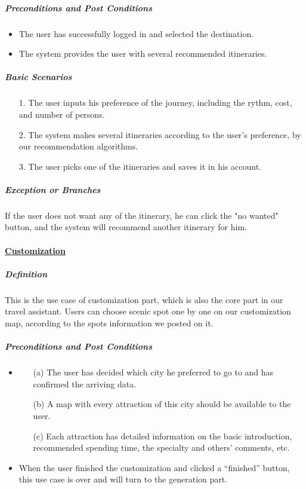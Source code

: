 \documentclass[10pt]{article}
\begin{document}
\begin{itemize}
		\subparagraph{Preconditions and Post Conditions}
		\begin{itemize}
			\item The user has successfully logged in and selected the destination.
			\item The system provides the user with several recommended itineraries.
		\end{itemize}

		\subparagraph{Basic Scenarios}
		\begin{itemize}
			\item[1.] The user inputs his preference of the journey, including the rythm, cost, and number of persons.
			\item[2.]The system makes several itineraries according to the user's preference, by our recommendation algorithms.
			\item[3.]The user picks one of the itineraries and saves it in his account.
		
		\end{itemize}

		\subparagraph{Exception or Branches}
		If the user does not want any of the itinerary, he can click the "no wanted" button, and the system will recommend another itinerary for him.

		\paragraph{\underline{Customization}}
		\subparagraph{Definition}
		This is the use case of customization part, which is also the core part in our travel assistant. Users can choose scenic spot one by one on our customization map, according to the spots information we posted on it.

		\subparagraph{Preconditions and Post Conditions}
		\begin{itemize}
			\item \begin{itemize}
				\item[(a)] The user has decided which city he preferred to go to and has confirmed the arriving data.
				\item[(b)] A map with every attraction of this city should be available to the user.
				\item[(c)] Each attraction has detailed information on the basic introduction, recommended spending time, the specialty and others’ comments, etc. 
			\end{itemize}
			\item When the user finished the customization and clicked a “finished” button, this use case is over and will turn to the generation part.
		\end{itemize}


\end{itemize}
\end{document}
